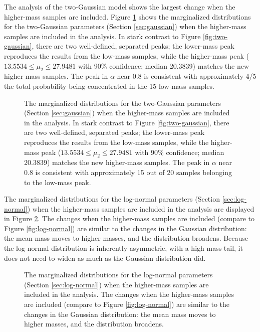 \documentclass[preprint]{aastex}
\begin{document}
The analysis of the two-Gaussian model shows the largest change when
the higher-mass samples are included.  Figure
\ref{fig:two-gaussian-high} shows the marginalized distributions for
the two-Gaussian parameters (Section \ref{sec:gaussian}) when the
higher-mass samples are included in the analysis.  In stark contrast
to Figure \ref{fig:two-gaussian}, there are two well-defined,
separated peaks; the lower-mass peak reproduces the results from the
low-mass samples, while the higher-mass peak ($13.5534 \leq \mu_2 \leq
27.9481$ with 90\% confidence; median 20.3839) matches the new
higher-mass samples.  The peak in $\alpha$ near 0.8 is consistent with
approximately 4/5 the total probability being concentrated in the 15
low-mass samples.

\begin{figure}
  \begin{center}
  \end{center}
  \caption{\label{fig:two-gaussian-high} The marginalized
    distributions for the two-Gaussian parameters (Section
    \ref{sec:gaussian}) when the higher-mass samples are included in
    the analysis.  In stark contrast to Figure \ref{fig:two-gaussian},
    there are two well-defined, separated peaks; the lower-mass peak
    reproduces the results from the low-mass samples, while the
    higher-mass peak ($13.5534 \leq \mu_2 \leq 27.9481$ with 90\%
    confidence; median 20.3839) matches the new higher-mass samples.
    The peak in $\alpha$ near 0.8 is consistent with approximately 15
    out of 20 samples belonging to the low-mass peak.}
\end{figure}

The marginalized distributions for the log-normal parameters (Section
\ref{sec:log-normal}) when the higher-mass samples are included in the
analysis are displayed in Figure \ref{fig:log-normal-high}.  The
changes when the higher-mass samples are included (compare to Figure
\ref{fig:log-normal}) are similar to the changes in the Gaussian
distribution: the mean mass moves to higher masses, and the
distribution broadens.  Because the log-normal distribution is
inherently asymmetric, with a high-mass tail, it does not need to
widen as much as the Gaussian distribution did.

\begin{figure}
  \begin{center}
  \end{center}
  \caption{\label{fig:log-normal-high} The marginalized distributions
    for the log-normal parameters (Section \ref{sec:log-normal}) when
    the higher-mass samples are included in the analysis.  The changes
    when the higher-mass samples are included (compare to Figure
    \ref{fig:log-normal}) are similar to the changes in the Gaussian
    distribution: the mean mass moves to higher masses, and the
    distribution broadens.}
\end{figure}
\end{document}
